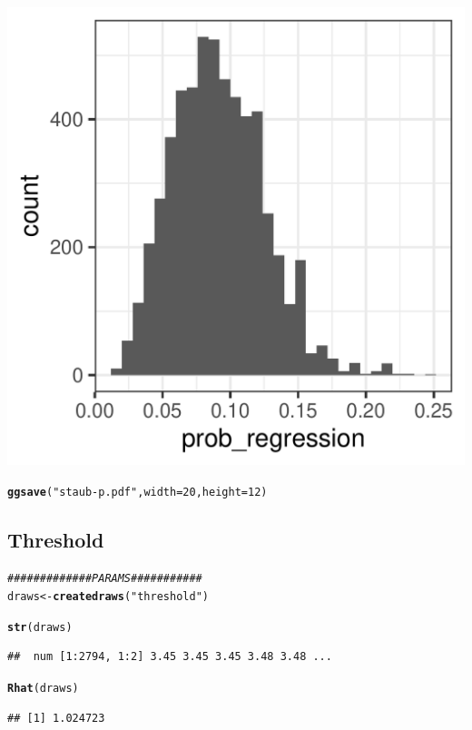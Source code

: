 \documentclass{article}\usepackage[]{graphicx}\usepackage[]{color}
\makeatletter
\def\maxwidth{ %
  \ifdim\Gin@nat@width>\linewidth
    \linewidth
  \else
    \Gin@nat@width
  \fi
}
\newcommand{\hlnum}[1]{\textcolor[rgb]{0.686,0.059,0.569}{#1}}%
\newcommand{\hlstr}[1]{\textcolor[rgb]{0.192,0.494,0.8}{#1}}%
\newcommand{\hlcom}[1]{\textcolor[rgb]{0.678,0.584,0.686}{\textit{#1}}}%
\newcommand{\hlstd}[1]{\textcolor[rgb]{0.345,0.345,0.345}{#1}}%
\newcommand{\hlkwb}[1]{\textcolor[rgb]{0.69,0.353,0.396}{#1}}%
\newcommand{\hlkwc}[1]{\textcolor[rgb]{0.333,0.667,0.333}{#1}}%
\newcommand{\hlkwd}[1]{\textcolor[rgb]{0.737,0.353,0.396}{\textbf{#1}}}%
\newenvironment{kframe}{%
 \def\at@end@of@kframe{}%
 \ifinner\ifhmode%
  \def\at@end@of@kframe{\end{minipage}}%
  \begin{minipage}{\columnwidth}%
 \fi\fi%
 \def\FrameCommand##1{\hskip\@totalleftmargin \hskip-\fboxsep
 \colorbox{shadecolor}{##1}\hskip-\fboxsep
     \hskip-\linewidth \hskip-\@totalleftmargin \hskip\columnwidth}%
 \MakeFramed {\advance\hsize-\width
   \@totalleftmargin\z@ \linewidth\hsize
   \@setminipage}}%
 {\par\unskip\endMakeFramed%
 \at@end@of@kframe}
\newenvironment{knitrout}{}{} %
\makeatother
\begin{document}
\begin{knitrout}
\begin{kframe}
{\ttfamily\noindent\itshape\color{messagecolor}{\#\# `stat\_bin()` using `bins = 30`. Pick better value with `binwidth`.}}\end{kframe}
\includegraphics[width=\maxwidth]{figures/figure_staub_exp3unnamed-chunk-24-1} 
\begin{kframe}\begin{alltt}
\hlkwd{ggsave}\hlstd{(}\hlstr{"staub-p.pdf"}\hlstd{,} \hlkwc{width} \hlstd{=} \hlnum{20}\hlstd{,} \hlkwc{height} \hlstd{=} \hlnum{12}\hlstd{)}
\end{alltt}


{\ttfamily\noindent\itshape\color{messagecolor}{\#\# `stat\_bin()` using `bins = 30`. Pick better value with `binwidth`.}}\end{kframe}
\end{knitrout}


\subsection{Threshold}

\begin{knitrout}
\color{fgcolor}\begin{kframe}
\begin{alltt}
\hlcom{############# PARAMS###########}
\hlstd{draws} \hlkwb{<-} \hlkwd{createdraws}\hlstd{(}\hlstr{"threshold"}\hlstd{)}

\hlkwd{str}\hlstd{(draws)}
\end{alltt}
\begin{verbatim}
##  num [1:2794, 1:2] 3.45 3.45 3.45 3.48 3.48 ...
\end{verbatim}
\begin{alltt}
\hlkwd{Rhat}\hlstd{(draws)}
\end{alltt}
\begin{verbatim}
## [1] 1.024723
\end{verbatim}
\end{kframe}
\end{knitrout}
\end{document}
